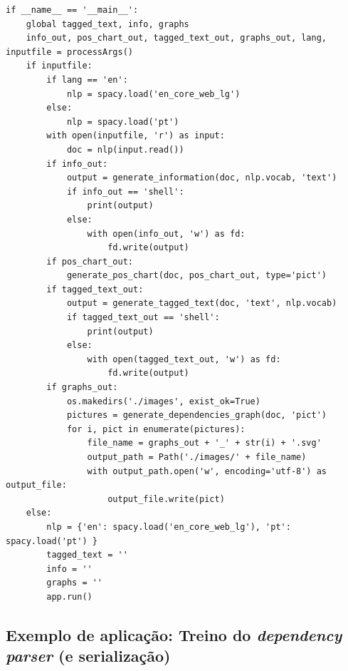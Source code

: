 \documentclass[12pt]{article}
\begin{document}
\begin{verbatim}
if __name__ == '__main__':
    global tagged_text, info, graphs
    info_out, pos_chart_out, tagged_text_out, graphs_out, lang, inputfile = processArgs()
    if inputfile:
        if lang == 'en':
            nlp = spacy.load('en_core_web_lg')
        else:
            nlp = spacy.load('pt')
        with open(inputfile, 'r') as input:
            doc = nlp(input.read())
        if info_out:
            output = generate_information(doc, nlp.vocab, 'text')
            if info_out == 'shell':
                print(output)
            else:
                with open(info_out, 'w') as fd:
                    fd.write(output)
        if pos_chart_out:
            generate_pos_chart(doc, pos_chart_out, type='pict')
        if tagged_text_out:
            output = generate_tagged_text(doc, 'text', nlp.vocab)
            if tagged_text_out == 'shell':
                print(output)
            else:
                with open(tagged_text_out, 'w') as fd:
                    fd.write(output)
        if graphs_out:
            os.makedirs('./images', exist_ok=True)
            pictures = generate_dependencies_graph(doc, 'pict')
            for i, pict in enumerate(pictures):
                file_name = graphs_out + '_' + str(i) + '.svg'
                output_path = Path('./images/' + file_name)
                with output_path.open('w', encoding='utf-8') as output_file:
                    output_file.write(pict)
    else:
        nlp = {'en': spacy.load('en_core_web_lg'), 'pt': spacy.load('pt') }
        tagged_text = ''
        info = ''
        graphs = ''
        app.run()
\end{verbatim}

\newpage

\subsection{Exemplo de aplicação: Treino do \textit{dependency parser} (e serialização)}
\label{anexo:treino}
\end{document}
